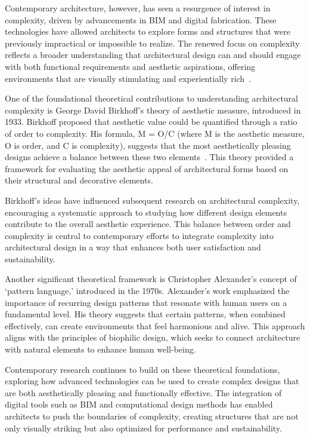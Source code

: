 Contemporary architecture, however, has seen a resurgence of interest in complexity, driven by advancements in BIM and digital fabrication.
These technologies have allowed architects to explore forms and structures that were previously impractical or impossible to realize.
The renewed focus on complexity reflects a broader understanding that architectural design can and should engage with both functional requirements and aesthetic aspirations, offering environments that are visually stimulating and experientially rich~\cite{Gage2015}.

One of the foundational theoretical contributions to understanding architectural complexity is George David Birkhoff's theory of aesthetic measure, introduced in 1933. Birkhoff proposed that aesthetic value could be quantified through a ratio of order to complexity. His formula, M = O/C (where M is the aesthetic measure, O is order, and C is complexity), suggests that the most aesthetically pleasing designs achieve a balance between these two elements~\cite{Birkhoff1933}. This theory provided a framework for evaluating the aesthetic appeal of architectural forms based on their structural and decorative elements.

Birkhoff's ideas have influenced subsequent research on architectural complexity, encouraging a systematic approach to studying how different design elements contribute to the overall aesthetic experience. This balance between order and complexity is central to contemporary efforts to integrate complexity into architectural design in a way that enhances both user satisfaction and sustainability.

Another significant theoretical framework is Christopher Alexander's concept of `pattern language,' introduced in the 1970s.
Alexander's work emphasized the importance of recurring design patterns that resonate with human users on a fundamental level.
His theory suggests that certain patterns, when combined effectively, can create environments that feel harmonious and alive.
This approach aligns with the principles of biophilic design, which seeks to connect architecture with natural elements to enhance human well-being.

Contemporary research continues to build on these theoretical foundations, exploring how advanced technologies can be used to create complex designs that are both aesthetically pleasing and functionally effective. The integration of digital tools such as BIM and computational design methods has enabled architects to push the boundaries of complexity, creating structures that are not only visually striking but also optimized for performance and sustainability.

